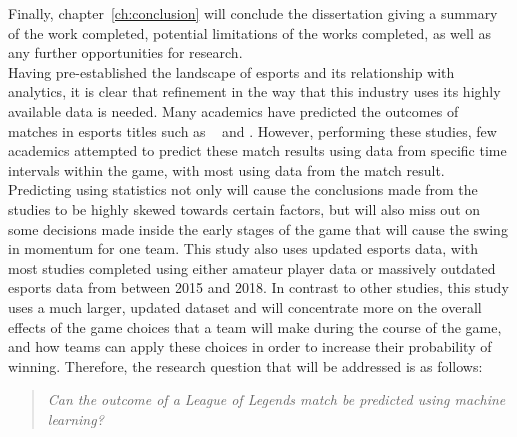 Finally, chapter~\ref{ch:conclusion} will conclude the dissertation giving a summary of the work completed, potential limitations of the works completed, as well as any further opportunities for research. \\

Having pre-established the landscape of esports and its relationship with analytics, it is clear that refinement in the way that this industry uses its highly available data is needed.
Many academics have predicted the outcomes of matches in esports titles such as ~\citet{ani2019victory} and \citet{lin2016league}.
However, performing these studies, few academics attempted to predict these match results using data from specific time intervals within the game, with most using data from the match result.
Predicting using statistics not only will cause the conclusions made from the studies to be highly skewed towards certain factors, but will also miss out on some decisions made inside the early stages of the game that will cause the swing in momentum for one team.
This study also uses updated esports data, with most studies completed using either amateur player data or massively outdated esports data from between 2015 and 2018.
In contrast to other studies, this study uses a much larger, updated dataset and will concentrate more on the overall effects of the game choices that a team will make during the course of the game, and how teams can apply these choices in order to increase their probability of winning.
Therefore, the research question that will be addressed is as follows:

\begin{quote}  \emph{Can the outcome of a League of Legends match be predicted using machine learning?} \end{quote}
